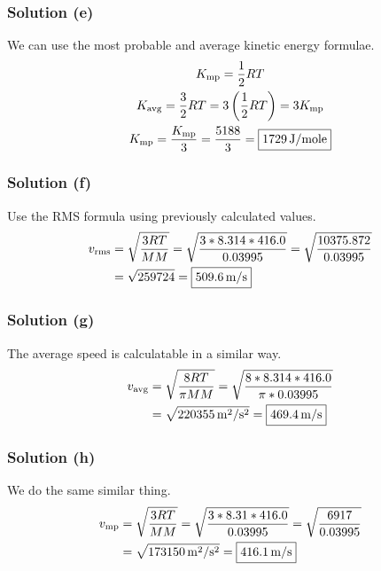 \documentclass[10pt]{article}
\begin{document}
            \subsubsection{Solution (e)}
                We can use the most probable and average kinetic energy formulae. 
                \begin{gather}
                    K_{\rm mp}  =   \frac{1}{2} RT\\
                    K_{\rm avg} =   \frac{3}{2} RT
                        =   3 \left( \frac{1}{2} RT \right)
                        =   3 K_{\rm mp}\\
                    K_{\rm mp}  =   \frac{K_{\rm mp}}{3}
                        =   \frac{5188}{3}
                        =   \boxed{1729\,\unit{\joule/mole}}
                \end{gather}

            \subsubsection{Solution (f)}
                Use the RMS formula using previously calculated values.
                \begin{align}
                    v_{\rm rms} &=  \sqrt{\frac{3RT}{MM}}
                        =   \sqrt{\frac{3*8.314*416.0}{0.03995}}
                        =   \sqrt{\frac{10375.872}{0.03995}}\\
                        &=  \sqrt{259724}
                        =   \boxed{509.6\,\unit{\meter/\second}}
                \end{align}

            \subsubsection{Solution (g)}
                The average speed is calculatable in a similar way.
                \begin{align}
                    v_{\rm avg} &=  \sqrt{\frac{8RT}{\pi MM}}
                        =   \sqrt{\frac{8 * 8.314 * 416.0}{\pi * 0.03995}}\\
                        &=  \sqrt{220355\,\unit{\meter^2/\second^2}}
                        =   \boxed{469.4\,\unit{\meter/\second}}
                \end{align}

            \subsubsection{Solution (h)}
                We do the same similar thing. 
                \begin{align}
                    v_{\rm mp}  &=  \sqrt{\frac{3RT}{MM}}
                        =   \sqrt{\frac{3*8.31*416.0}{0.03995}}
                        =   \sqrt{\frac{6917}{0.03995}}\\
                        &=  \sqrt{173150\,\unit{\meter^2/\second^2}}
                        =   \boxed{416.1\,\unit{\meter/\second}}
                \end{align}
\end{document}
